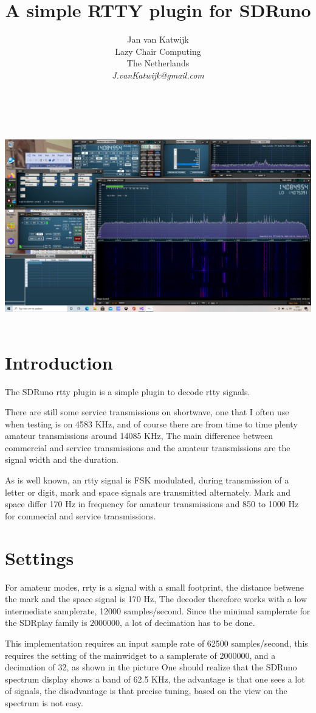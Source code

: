 \documentclass[11pt]{article}
\begin{document}
\title{A simple RTTY plugin for SDRuno}
\author{
Jan van Katwijk\\
Lazy Chair Computing \\
The Netherlands\\
{\em J.vanKatwijk@gmail.com}}
\maketitle
\ \\
\ \\
\includegraphics[width=140mm]{rtty-example.png}
\ \\
\section{Introduction}
The SDRuno rtty plugin is a simple plugin to decode rtty signals.

There are still some service transmissions on shortwave, one that
I often use when testing is on 4583 KHz, and of course
there are from time to time plenty amateur transmissions around 14085 KHz,
The main difference between commercial and service transmissions and the
amateur transmissions are the signal width and the duration.
\par
As is well known, an rtty signal is FSK modulated, during transmission
of a letter or digit,  mark and space signals are transmitted alternately.
Mark and space differ 170 Hz in frequency
for amateur transmissions and 850 to 1000 Hz for commecial and
service transmissions.

\section{Settings}
For amateur modes, rrty is a signal with a small footprint, the distance
betwene the mark and the space signal is 170 Hz, 
The decoder therefore works with a low intermediate samplerate, 
12000 samples/second. Since the minimal samplerate for the
SDRplay family is 2000000, a lot of decimation has to be done.
\par
This implementation requires an input sample rate of 62500 samples/second,
this requires the setting of the mainwidget to a samplerate of 2000000,
and a decimation of 32, as shown in the picture
One should realize that the SDRuno spectrum display shows a band of 62.5
KHz, the advantage is that one sees a lot of signals, the disadvantage
is that precise tuning, based on the view on the spectrum is not easy.
\end{document}
